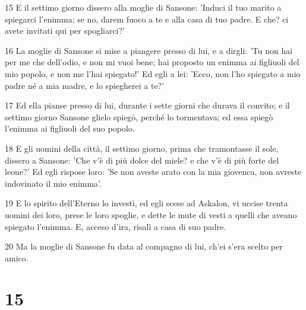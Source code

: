 \par 15 E il settimo giorno dissero alla moglie di Sansone: 'Induci il tuo marito a spiegarci l'enimma; se no, darem fuoco a te e alla casa di tuo padre. E che? ci avete invitati qui per spogliarci?'
\par 16 La moglie di Sansone si mise a piangere presso di lui, e a dirgli: 'Tu non hai per me che dell'odio, e non mi vuoi bene; hai proposto un enimma ai figliuoli del mio popolo, e non me l'hai spiegato!' Ed egli a lei: 'Ecco, non l'ho spiegato a mio padre né a mia madre, e lo spiegherei a te?'
\par 17 Ed ella pianse presso di lui, durante i sette giorni che durava il convito; e il settimo giorno Sansone glielo spiegò, perché lo tormentava; ed essa spiegò l'enimma ai figliuoli del suo popolo.
\par 18 E gli uomini della città, il settimo giorno, prima che tramontasse il sole, dissero a Sansone: 'Che v'è di più dolce del miele? e che v'è di più forte del leone?' Ed egli rispose loro: 'Se non aveste arato con la mia giovenca, non avreste indovinato il mio enimma'.
\par 19 E lo spirito dell'Eterno lo investì, ed egli scese ad Askalon, vi uccise trenta uomini dei loro, prese le loro spoglie, e dette le mute di vesti a quelli che aveano spiegato l'enimma. E, acceso d'ira, risalì a casa di suo padre.
\par 20 Ma la moglie di Sansone fu data al compagno di lui, ch'ei s'era scelto per amico.

\chapter{15}

